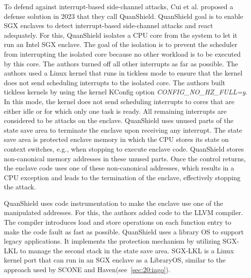 To defend against interrupt-based side-channel attacks, Cui et al. proposed a defense solution in 2023 that they call
QuanShield.\cite{cui_quanshield_2023} QuanShield goal is to enable SGX enclaves to detect interrupt-based side-channel
attacks and react adequately. For this, QuanShield isolates a CPU core from the system to let it run
an Intel SGX enclave. The goal of the isolation is to prevent the scheduler from interrupting the isolated core because
no other workload is to be executed by this core. The authors turned off all other interrupts as far as possible. The
authors used a Linux kernel that runs in tickless mode to ensure that the kernel does not send scheduling interrupts to
the isolated core. The authors built tickless kernels by using the kernel KConfig option
\textit{CONFIG\_NO\_HZ\_FULL=y}. In this mode, the kernel does not send scheduling interrupts to cores that are either
idle or for which only one task is ready.\cite{linuxtickless} All remaining interrupts are considered to be attacks on the enclave.
QuanShield uses unused parts of the state save area to terminate the enclave upon receiving any interrupt. The state
save area is protected enclave memory in which the CPU stores its state on context switches, e.g., when stopping to
execute enclave code. QuanShield stores non-canonical memory addresses in these unused parts. Once the control returns,
the enclave code uses one of these non-canonical addresses, which results in a CPU exception and leads to the
termination of the enclave, effectively stopping the attack.

QuanShield uses code instrumentation to make the enclave use one of the manipulated addresses. For this, the authors
added code to the LLVM compiler. The compiler introduces load and store operations on each function entry to make the
code fault as fast as possible. QuanShield uses a library OS to support legacy applications. It implements the
protection mechanism by utilizing SGX-LKL to manage the second stack in the state save area. SGX-LKL is a Linux kernel
port that can run in an SGX enclave as a LibraryOS, similar to the approach used by SCONE and
Haven(see~\ref{sec:20:iago}).\cite{priebe2019sgx}
